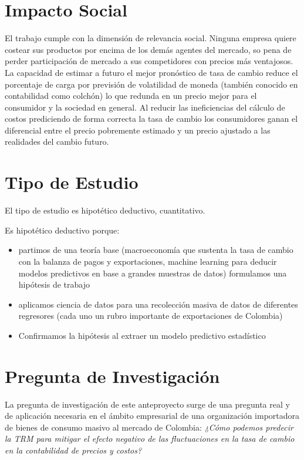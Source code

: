 \begin{spacing}{1.5}
\section{Impacto Social}
El trabajo cumple con la dimensión de relevancia social. Ninguna empresa quiere costear sus productos por encima de los demás agentes del mercado, so pena de perder participación de mercado a sus competidores con precios más ventajosos. La capacidad de estimar a futuro el mejor pronóstico de tasa de cambio reduce el porcentaje de carga por previsión de volatilidad de moneda (también conocido en contabilidad como colchón) lo que redunda en un precio mejor para el consumidor y la sociedad en general. Al reducir las ineficiencias del cálculo de costos prediciendo de forma correcta la tasa de cambio los consumidores ganan el diferencial entre el precio pobremente estimado y un precio ajustado a las realidades del cambio futuro.

\section{Tipo de Estudio}
El tipo de estudio es hipotético deductivo, cuantitativo.

Es hipotético deductivo porque:

\begin{itemize}
\item partimos de una teoría base (macroeconomía que sustenta la tasa de cambio con la balanza de pagos y exportaciones, machine learning para deducir modelos predictivos en base a grandes muestras de datos) formulamos una hipótesis de trabajo
\item aplicamos ciencia de datos para una recolección masiva de datos de diferentes regresores (cada uno un rubro importante de exportaciones de Colombia)
\item Confirmamos la hipótesis al extraer un modelo predictivo estadístico  
\end{itemize}

\section{Pregunta de Investigación}
La pregunta de investigación de este anteproyecto surge de una pregunta real y de aplicación necesaria en el ámbito empresarial de una organización importadora de bienes de consumo masivo al mercado de Colombia: \emph{¿Cómo podemos predecir la TRM para mitigar el efecto negativo de las fluctuaciones en la tasa de cambio en la contabilidad de precios y costos?}


\end{spacing}
